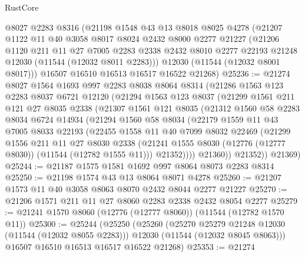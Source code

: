 \begin{lexlean}{RustCore}
\begin{coremodule}
    @8027
    @2283
    @8316
    (@21198
      @1548
      @43
      @13
      @8018
      @8025
      @4278
      (@21207
        @1122
        @11
        @40
        @3058
        @8017
        @8024
        @2432
        @8000
        @2277
        @21227
        (@21206
          @1120
          @211
          @11
          @27
          @7005
          @2283
          @2338
          @2432
          @8010
          @2277
          @22193
          @21248
          @12030
          (@11544 (@12032 @8011 @2283)))
        @12030
        (@11544 (@12032 @8001 @8017)))
      @16507
      @16510
      @16513
      @16517
      @16522
      @21268)
@25236 := @21274
    @8027
    @1564
    @1693
    @997
    @2283
    @8038
    @8064
    @8314
    (@21286
      @1563
      @123
      @2283
      @8037
      @6721
      @12120
      (@21294
        @1563
        @123
        @8037
        (@21299
          @1561
          @211
          @121
          @27
          @8035
          @2338
          (@21307
            @1561
            @121
            @8035
            (@21312
              @1560
              @58
              @2283
              @8034
              @6724
              @14934
              (@21294
                @1560
                @58
                @8034
                (@22179
                  @1559
                  @11
                  @43
                  @7005
                  @8033
                  @22193
                  (@22455
                    @1558
                    @11
                    @40
                    @7099
                    @8032
                    @22469
                    (@21299
                      @1556
                      @211
                      @11
                      @27
                      @8030
                      @2338
                      (@21241 @1555 @8030 (@12776 (@12777 @8030)) (@11544 (@12782 @1555 @11)))
                      @21352))))
              @21360))
          @21352))
      @21369)
@25244 := @21187 @1575 @1581 @1692 @997 @8064 @8073 @2283 @8314
@25250 := @21198 @1574 @43 @13 @8064 @8071 @4278
@25260 := @21207 @1573 @11 @40 @3058 @8063 @8070 @2432 @8044 @2277 @21227
@25270 := @21206 @1571 @211 @11 @27 @8060 @2283 @2338 @2432 @8054 @2277
@25279 := @21241 @1570 @8060 (@12776 (@12777 @8060)) (@11544 (@12782 @1570 @11))
@25300 := @25244
    (@25250
      (@25260
        (@25270 @25279 @21248 @12030 (@11544 (@12032 @8055 @2283)))
        @12030
        (@11544 (@12032 @8045 @8063)))
      @16507
      @16510
      @16513
      @16517
      @16522
      @21268)
@25353 := @21274

\end{coremodule}
\end{lexlean}

